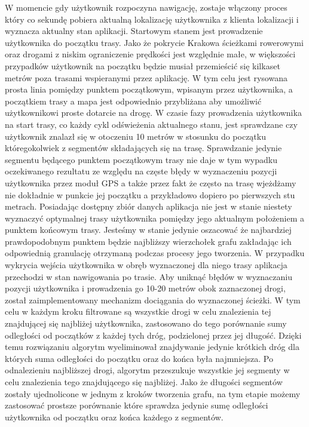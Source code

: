 W momencie gdy użytkownik rozpoczyna nawigację, zostaje włączony proces który co sekundę pobiera aktualną lokalizację użytkownika z klienta lokalizacji i wyznacza aktualny stan aplikacji. Startowym stanem jest prowadzenie użytkownika do początku trasy. Jako że pokrycie Krakowa ścieżkami rowerowymi oraz drogami z niskim ograniczenie prędkości jest względnie małe, w większości przypadków użytkownik na początku będzie musiał przemieścić się kilkaset metrów poza trasami wspieranymi przez aplikację. W tym celu jest rysowana prosta linia pomiędzy punktem początkowym, wpisanym przez użytkownika, a początkiem trasy a mapa jest odpowiednio przybliżana aby umożliwić użytkownikowi proste dotarcie na drogę. \newline
W czasie fazy prowadzenia użytkownika na start trasy, co każdy cykl odświeżenia aktualnego stanu, jest sprawdzane czy użytkownik znalazł się w otoczeniu 10 metrów w stosunku do początku któregokolwiek z segmentów składających się na trasę. Sprawdzanie jedynie segmentu będącego punktem początkowym trasy nie daje w tym wypadku oczekiwanego rezultatu ze względu na częste błędy w wyznaczeniu pozycji użytkownika przez moduł GPS a także przez fakt że często na trasę wjeżdżamy nie dokładnie w punkcie jej początku a przykładowo dopiero po pierwszych stu metrach. Posiadając dostępny zbiór danych aplikacja nie jest w stanie niestety wyznaczyć optymalnej trasy użytkownika pomiędzy jego aktualnym położeniem a punktem końcowym trasy. Jesteśmy w stanie jedynie oszacować że najbardziej prawdopodobnym punktem będzie najbliższy wierzchołek grafu zakładając ich odpowiednią granulację otrzymaną podczas procesy jego tworzenia. \newline
W przypadku wykrycia wejścia użytkownika w obręb wyznaczonej dla niego trasy aplikacja przechodzi w stan nawigowania po trasie. Aby uniknąć błędów w wyznaczaniu pozycji użytkownika i prowadzenia go 10-20 metrów obok zaznaczonej drogi, został zaimplementowany mechanizm dociągania do wyznaczonej ścieżki. W tym celu w każdym kroku filtrowane są wszystkie drogi w celu znalezienia tej znajdującej się najbliżej użytkownika, zastosowano do tego porównanie sumy odległości od początków z każdej tych dróg, podzielonej przez jej długość. Dzięki temu rozwiązaniu algorytm wyeliminował znajdywanie jedynie krótkich dróg dla których suma odległości do początku oraz do końca była najmniejsza. \newline
Po odnalezieniu najbliższej drogi, algorytm przeszukuje wszystkie jej segmenty w celu znalezienia tego znajdującego się najbliżej. Jako że długości segmentów zostały ujednolicone w jednym z kroków tworzenia grafu, na tym etapie możemy zastosować prostsze porównanie które sprawdza jedynie sumę odległości użytkownika od początku oraz końca każdego z segmentów.
